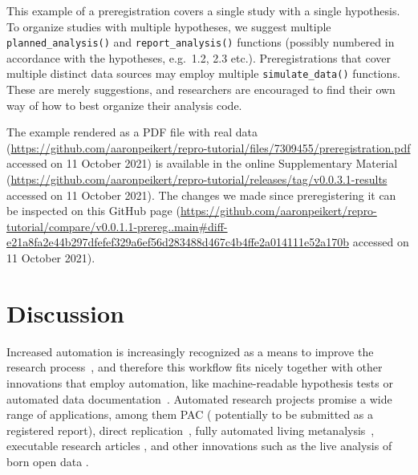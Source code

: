 \documentclass[psych,tutorial,accept,moreauthors,pdftex]{Definitions/mdpi}
\begin{document}
\begin{paracol}{2}
\switchcolumn


This example of a preregistration covers a single study with a single
hypothesis. To organize studies with multiple hypotheses, we suggest
multiple \texttt{planned\_analysis()} and \texttt{report\_analysis()}
functions (possibly numbered in accordance with the hypotheses,
e.g.~1.2, 2.3 etc.). Preregistrations that cover multiple distinct data
sources may employ multiple \texttt{simulate\_data()} functions. These
are merely suggestions, and researchers are encouraged to find their own
way of how to best organize their analysis code.

The example rendered as a {PDF file with real data}
(\url{https://github.com/aaronpeikert/repro-tutorial/files/7309455/preregistration.pdf} accessed on 11 October 2021) is available in the {online Supplementary Material}
(\url{https://github.com/aaronpeikert/repro-tutorial/releases/tag/v0.0.3.1-results} accessed on 11 October 2021). The changes we made since preregistering it can
be inspected on this {GitHub page}
(\url{https://github.com/aaronpeikert/repro-tutorial/compare/v0.0.1.1-prereg..main\#diff-e21a8fa2e44b297dfefef329a6ef56d283488d467c4b4ffe2a014111e52a170b} accessed on 11 October 2021).

\section{Discussion}\label{discussion}

Increased automation is increasingly recognized as a means to improve
the research process~\citep{rouderMinimizingMistakesPsychological2019},
and therefore this workflow fits nicely together with other innovations
that employ automation, like machine-readable hypothesis tests
\citep{lakensImprovingTransparencyFalsifiability2021} or automated data
documentation~\citep{arslanHowAutomaticallyDocument2019}. Automated
research projects promise a wide range of applications, among them PAC
(\citep{nosekRegisteredReports2014, chambersWhatNextRegistered2019} potentially to be submitted as a registered
report),
direct replication~\citep{simonsValueDirectReplication2014}, fully
automated living metanalysis~\citep{elliottLivingSystematicReviews2014},
executable research articles
\citep{elifesciencespublicationsELifeLaunchesExecutable2020}, and other
innovations such as the live analysis of born open data
\citep{rouderWhatWhyHow2016, kekecsRaisingValueResearch2019}.


\end{paracol}
\end{document}
